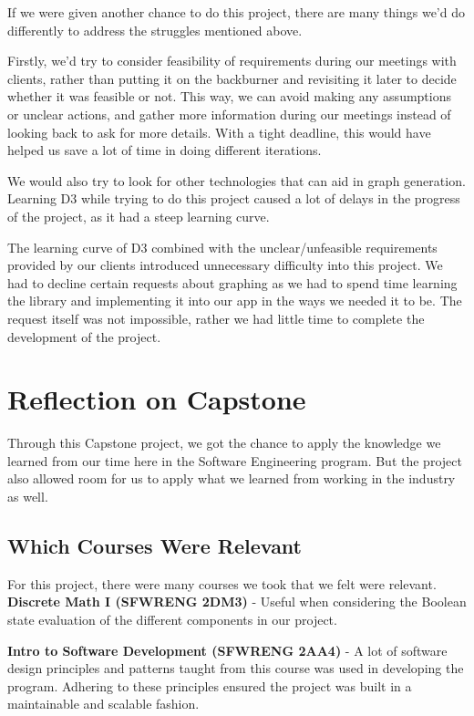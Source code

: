 \documentclass{article}
\begin{document}
If we were given another chance to do this project, there are many things we'd
do differently to address the struggles mentioned above.

Firstly, we'd try to consider feasibility of requirements during our meetings
with clients, rather than putting it on the backburner and revisiting it later
to decide whether it was feasible or not. This way, we can avoid making any
assumptions or unclear actions, and gather more information during our meetings
instead of looking back to ask for more details. With a tight deadline, this
would have helped us save a lot of time in doing different iterations. 

We would also try to look for other technologies that can aid in graph
generation. Learning D3 while trying to do this project caused a lot of delays
in the progress of the project, as it had a steep learning curve. 

The learning curve of D3 combined with the unclear/unfeasible requirements
provided by our clients introduced unnecessary difficulty into this project. We
had to decline certain requests about graphing as we had to spend time learning
the library and implementing it into our app in the ways we needed it to be. The
request itself was not impossible, rather we had little time to complete the
development of the project.
\section{Reflection on Capstone}

Through this Capstone project, we got the chance to apply the knowledge we
learned from our time here in the Software Engineering program. But the project
also allowed room for us to apply what we learned from working in the industry
as well. 
\subsection{Which Courses Were Relevant}

For this project, there were many courses we took that we felt were relevant.
\textbf{Discrete Math I (SFWRENG 2DM3)} - Useful when considering the Boolean state
evaluation of the different components in our project.

\textbf{Intro to Software Development (SFWRENG 2AA4)} - A lot of software design
principles and patterns taught from this course was used in developing the
program. Adhering to these principles ensured the project was built in a
maintainable and scalable fashion.
\end{document}
